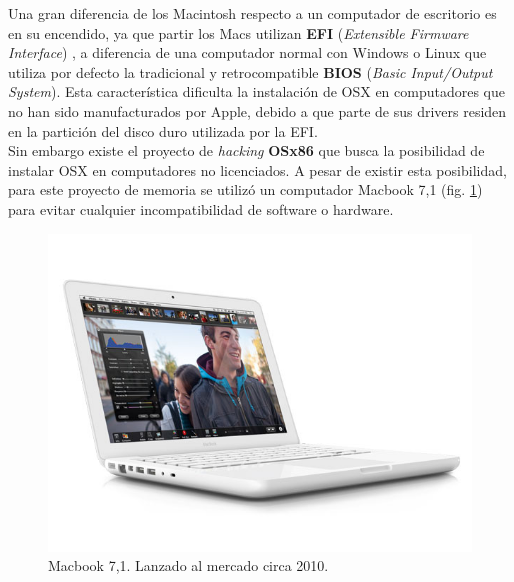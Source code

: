 		 Una gran diferencia de los Macintosh respecto a un computador de escritorio es en su encendido, ya que partir los Macs utilizan \textbf{EFI} (\textit{Extensible Firmware Interface}) , a diferencia de una computador normal con Windows o Linux que utiliza por defecto la tradicional y retrocompatible \textbf{BIOS} (\textit{Basic Input/Output System}). Esta característica dificulta la instalación de OSX en computadores que no han sido manufacturados por Apple, debido a que parte de sus drivers residen en la partición del disco duro utilizada por la EFI.\\
		 
		 Sin embargo existe el proyecto de \textit{hacking} \textbf{OSx86} \cite{web:osx86} que busca la posibilidad de instalar OSX  en computadores no licenciados. A pesar de existir esta posibilidad, para este proyecto de memoria se utilizó un computador Macbook 7,1 (fig. \ref{img:macbook71}) para evitar cualquier incompatibilidad de software o hardware.
		 
\begin{figure}[H]
	\centering
	\includegraphics[scale=0.35]{imgs/macbook71.png} 
	\caption{Macbook 7,1. Lanzado al mercado circa 2010.}
	\label{img:macbook71}
\end{figure} 	 
		


